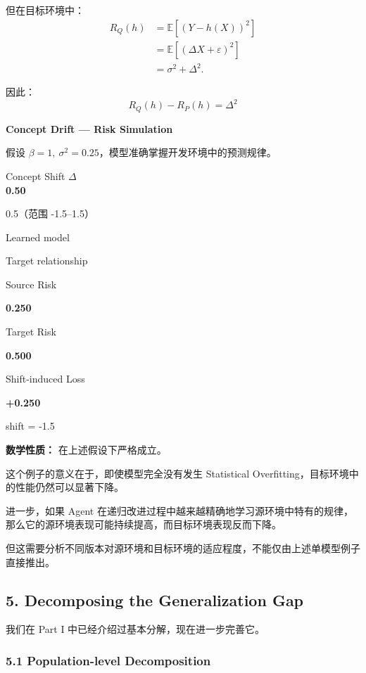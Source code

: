 但在目标环境中：
\[\begin{aligned}
R_Q(h)
&=\mathbb E[(Y-h(X))^2]\\
&=\mathbb E[(\Delta X+\varepsilon)^2]\\
&=\sigma^2+\Delta^2.
\end{aligned}\]

因此：
\[\boxed{
R_Q(h)-R_P(h)=\Delta^2
}\]

\textbf{Concept Drift --- Risk Simulation}

假设 \(\beta=1,\ \sigma^2=0.25\)，模型准确掌握开发环境中的预测规律。

Concept Shift \(\Delta\)\\
\textbf{0.50}

0.5（范围 -1.5--1.5）


Learned model

Target relationship

Source Risk

\textbf{0.250}

Target Risk

\textbf{0.500}

Shift-induced Loss

\textbf{+0.250}

shift = -1.5


\textbf{数学性质：} 在上述假设下严格成立。

这个例子的意义在于，即使模型完全没有发生 Statistical Overfitting，目标环境中的性能仍然可以显著下降。

进一步，如果 Agent 在递归改进过程中越来越精确地学习源环境中特有的规律，那么它的源环境表现可能持续提高，而目标环境表现反而下降。

但这需要分析不同版本对源环境和目标环境的适应程度，不能仅由上述单模型例子直接推出。

\hypertarget{part-2-23-0001-decomposing-the-generalization-gap}{%
\subsection{5. Decomposing the Generalization Gap}\label{part-2-23-0001-decomposing-the-generalization-gap}}

我们在 Part I 中已经介绍过基本分解，现在进一步完善它。

\hypertarget{part-2-23-0001-population-level-decomposition}{%
\subsubsection{5.1 Population-level Decomposition}\label{part-2-23-0001-population-level-decomposition}}

